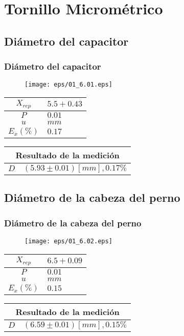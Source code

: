 \documentclass[letter,11pt]{beamer}
\begin{document}
\section{Tornillo Micrométrico}

\subsection{Diámetro del capacitor}
\begin{frame}
\frametitle{Diámetro del capacitor}
\vspace*{0.8cm}
\begin{figure}
\centering
\texttt{[image: eps/01\_6.01.eps]}
\end{figure}
\vspace*{0.4cm}
\scriptsize
\begin{tabular}{|c|>{\centering}m{1.8cm}<{\centering}|}
\hline
$X_{rep}$ &  $5.5+0.43$ \tabularnewline \hline
      $P$ &      $0.01$ \tabularnewline \hline
      $u$ &        $mm$ \tabularnewline \hline
$E_x(\%)$ &      $0.17$ \tabularnewline \hline
\end{tabular}
\quad
\begin{tabular}{|c|>{\centering}m{5.7cm}<{\centering}|}
\hline
\multicolumn{2}{|c|}{\textbf{Resultado de la medición}} \\ \hline
$D$ & $( 5.93\pm0.01)[mm], 0.17\%$ \tabularnewline \hline
\end{tabular}
\end{frame}

\subsection{Diámetro de la cabeza del perno}
\begin{frame}
\frametitle{Diámetro de la cabeza del perno}
\vspace*{0.8cm}
\begin{figure}
\centering
\texttt{[image: eps/01\_6.02.eps]}
\end{figure}
\vspace*{0.4cm}
\scriptsize
\begin{tabular}{|c|>{\centering}m{1.8cm}<{\centering}|}
\hline
$X_{rep}$ &  $6.5+0.09$ \tabularnewline \hline
      $P$ &      $0.01$ \tabularnewline \hline
      $u$ &        $mm$ \tabularnewline \hline
$E_x(\%)$ &      $0.15$ \tabularnewline \hline
\end{tabular}
\quad
\begin{tabular}{|c|>{\centering}m{5.7cm}<{\centering}|}
\hline
\multicolumn{2}{|c|}{\textbf{Resultado de la medición}} \\ \hline
$D$ & $( 6.59\pm0.01)[mm], 0.15\%$ \tabularnewline \hline
\end{tabular}
\end{frame}
\end{document}
